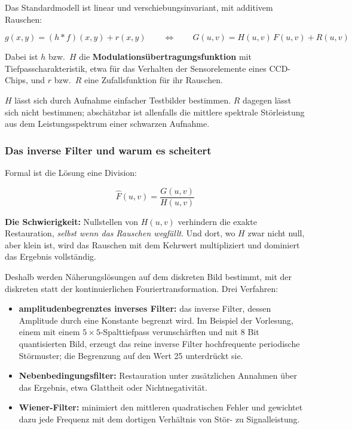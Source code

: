 \documentclass[12pt, a4paper]{article}
\begin{document}
Das Standardmodell ist linear und verschiebungsinvariant, mit additivem Rauschen:

\[
g(x,y) = (h * f)(x,y) + r(x,y)
\qquad\Longleftrightarrow\qquad
G(u,v) = H(u,v)\,F(u,v) + R(u,v)
\]

Dabei ist $h$ bzw.\ $H$ die \textbf{Modulationsübertragungsfunktion} mit
Tiefpasscharakteristik, etwa für das Verhalten der Sensorelemente eines CCD-Chips, und
$r$ bzw.\ $R$ eine Zufallsfunktion für ihr Rauschen.

$H$ lässt sich durch Aufnahme einfacher Testbilder bestimmen. $R$ dagegen lässt sich
nicht bestimmen; abschätzbar ist allenfalls die mittlere spektrale Störleistung aus dem
Leistungsspektrum einer schwarzen Aufnahme.

\subsubsection*{Das inverse Filter und warum es scheitert}

Formal ist die Lösung eine Division:

\[
\hat{F}(u,v) = \frac{G(u,v)}{H(u,v)}
\]

\begin{notebox}
\textbf{Die Schwierigkeit:} Nullstellen von $H(u,v)$ verhindern die exakte Restauration,
\textit{selbst wenn das Rauschen wegfällt}. Und dort, wo $H$ zwar nicht null, aber klein
ist, wird das Rauschen mit dem Kehrwert multipliziert und dominiert das Ergebnis
vollständig.
\end{notebox}

Deshalb werden Näherungslösungen auf dem diskreten Bild bestimmt, mit der diskreten
statt der kontinuierlichen Fouriertransformation. Drei Verfahren:

\begin{itemize}
  \item \textbf{amplitudenbegrenztes inverses Filter:} das inverse Filter, dessen
        Amplitude durch eine Konstante begrenzt wird. Im Beispiel der Vorlesung, einem
        mit einem $5 \times 5$-Spalttiefpass verunschärften und mit 8 Bit quantisierten
        Bild, erzeugt das reine inverse Filter hochfrequente periodische Störmuster;
        die Begrenzung auf den Wert 25 unterdrückt sie.
  \item \textbf{Nebenbedingungsfilter:} Restauration unter zusätzlichen Annahmen über
        das Ergebnis, etwa Glattheit oder Nichtnegativität.
  \item \textbf{Wiener-Filter:} minimiert den mittleren quadratischen Fehler und
        gewichtet dazu jede Frequenz mit dem dortigen Verhältnis von Stör- zu
        Signalleistung.
\end{itemize}
\end{document}
